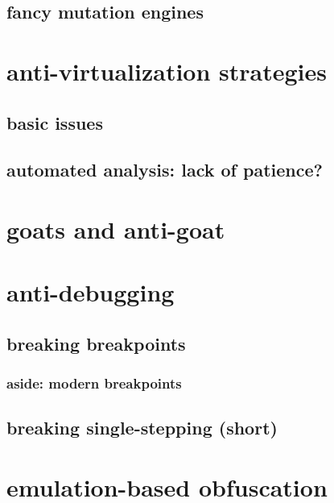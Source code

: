 \subsection{fancy mutation engines}


\section{anti-virtualization strategies}
\subsection{basic issues}


\subsection{automated analysis: lack of patience?}


\section{goats and anti-goat}


\section{anti-debugging}


\subsection{breaking breakpoints}



\subsubsection{aside: modern breakpoints}


\subsection{breaking single-stepping (short)}


\section{emulation-based obfuscation}


